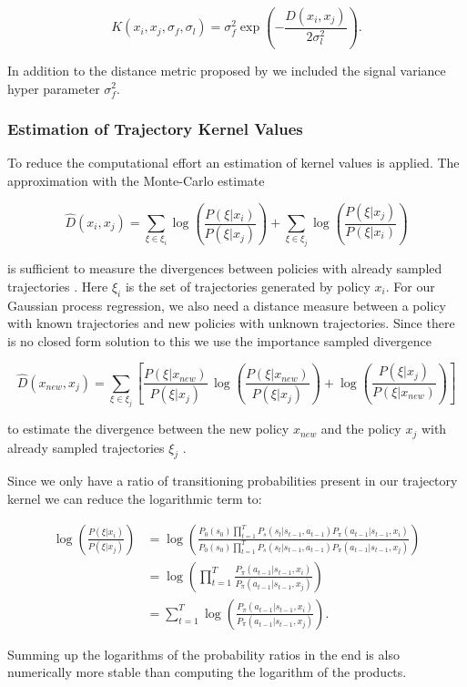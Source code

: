 \begin{equation} \label{eq:trajKernel}
K(x_{ i },x_{ j },\sigma_f,\sigma_l) = \sigma_f^2 \exp\left(-\frac{D(x_i,x_j)}{2\sigma_l^2} \right).
\end{equation}

In addition to the distance metric proposed by \cite{wilson2014using} we included the signal variance hyper parameter $\sigma_f^2$.

\subsubsection{Estimation of Trajectory Kernel Values}
To reduce the computational effort an estimation of kernel values is applied. The approximation with the Monte-Carlo estimate

\begin{equation} \label{eq:tk:mc}
    \hat{D}(x_{ i }, x_{ j }) = \sum _{\xi \in \xi_i} \log\left( \frac{P(\xi|x_{ i })}{P(\xi|x_{ j })} \right) + \sum _{\xi \in \xi_j} \log\left( \frac{P(\xi|x_{ j })}{P(\xi|x_{ i })} \right)
\end{equation}

is sufficient to measure the divergences between policies with already sampled trajectories \cite{wilson2014using}. Here $\xi_i$ is the set of trajectories generated by policy $x_i$. For our Gaussian process regression, we also need a distance measure between a policy with known trajectories and new policies with unknown trajectories. Since there is no closed form solution to this we use the importance sampled divergence

$$\hat{D}(x_{ new }, x_{ j }) = \sum _{\xi \in \xi_j} \left[\frac{P(\xi|x_{ new })}{P(\xi|x_{ j })}\,\log\left(\frac{P(\xi|x_{new})}{P(\xi|x_{j})}\right)+\log\left(\frac{P(\xi|x_{ j })}{P(\xi|x_{ new })}\right)\right] $$

to estimate the divergence between the new policy $x_{new}$ and the policy $x_j$ with already sampled trajectories $\xi_j$ \cite{wilson2014using}.

Since we only have a ratio of transitioning probabilities present in our trajectory kernel we can reduce the logarithmic term to:

\begin{align*}
    \log\left(\frac{P(\xi|x_i)}{P(\xi|x_j)}\right)
    &= \log\left(\frac{P_{0}(s_{0}) \prod_{t=1}^{T} P_s(s_{t}|s_{t-1},a_{t-1}) P_{\pi}(a_{t-1}|s_{t-1},x_i)}{P_{0}(s_{0}) \prod_{t=1}^{T} P_s(s_{t}|s_{t-1},a_{t-1}) P_{\pi}(a_{t-1}|s_{t-1},x_j)}\right)\\
    &= \log\left(\prod_{t=1}^{T}\frac{ P_{\pi}(a_{t-1}|s_{t-1},x_i)}{P_{\pi}(a_{t-1}|s_{t-1},x_j)}\right)\\
    &= \sum_{t=1}^{T} \log \left(\frac{P_{\pi}(a_{t-1}|s_{t-1},x_i)}{P_{\pi}(a_{t-1}|s_{t-1},x_j)}\right).
\end{align*}

Summing up the logarithms of the probability ratios in the end is also numerically more stable than computing the logarithm of the products.
